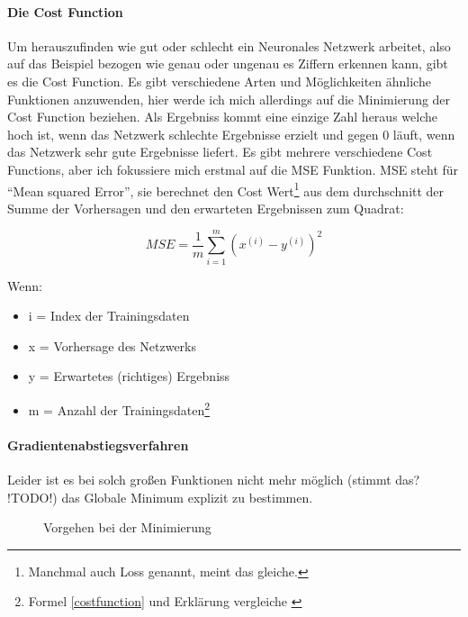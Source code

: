\paragraph{Die Cost Function}\label{paracost}

Um herauszufinden wie gut oder schlecht ein Neuronales Netzwerk arbeitet, also auf das Beispiel bezogen wie genau oder ungenau es Ziffern erkennen kann, gibt es die Cost Function. Es gibt verschiedene Arten und Möglichkeiten ähnliche Funktionen anzuwenden, hier werde ich mich allerdings auf die Minimierung der Cost Function beziehen. Als Ergebniss kommt eine einzige Zahl heraus welche hoch ist, wenn das Netzwerk schlechte Ergebnisse erzielt und gegen 0 läuft, wenn das Netzwerk sehr gute Ergebnisse liefert. Es gibt mehrere verschiedene Cost Functions, aber ich fokussiere mich erstmal auf die MSE Funktion. MSE steht für "`Mean squared Error"', sie berechnet den Cost Wert\footnote{Manchmal auch Loss genannt, meint das gleiche.} aus dem durchschnitt der Summe der Vorhersagen und den erwarteten Ergebnissen zum Quadrat:

\begin{equation}\label{costfunction}
    MSE = \frac{1}{m} \sum^{m}_{i=1}(x^{(i)}-y^{(i)})^2
\end{equation}

Wenn:

\begin{itemize}
    \item i = Index der Trainingsdaten
    \item x = Vorhersage des Netzwerks
    \item y = Erwartetes (richtiges) Ergebniss
    \item m = Anzahl der Trainingsdaten\footnote{Formel \ref{costfunction} und Erklärung vergleiche \cite{towardsds}}
\end{itemize}

\paragraph{Gradientenabstiegsverfahren}\label{paragrad}

Leider ist es bei solch großen Funktionen nicht mehr möglich (stimmt das? !TODO!) das Globale Minimum explizit zu bestimmen.

\begin{wrapfigure}{r}{80mm}
    
    \caption[2dcost]{Vorgehen bei der Minimierung}
    \label{2dcost}
\end{wrapfigure}

